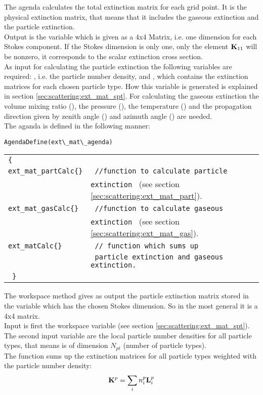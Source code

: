 The agenda  calculates the total extinction
matrix \ExtMat{}
for each grid point. It is the physical extinction matrix, that means
that it includes the gaseous extinction and the particle
extinction.\\
Output is the variable  which is given
as a 4x4 Matrix, i.e. one dimension for each Stokes component. If the
Stokes dimension is only one, only the element ${\bf K}_{11}$ will be
nonzero, it corresponds to the scalar extinction cross section. \\
As input for calculating the particle extinction the following
variables are required:
, i.e. the particle number density, and 
, which contains the extinction
matrices for each chosen particle type. How this variable is generated
is explained in section \ref{sec:scattering:ext_mat_spt}. For calculating the
gaseous extinction the volume mixing ratio (), the
pressure  (), the temperature  () and the
propagation direction given by zenith angle () and
azimuth angle () are needed.\\
The aganda is defined in the following manner:

\verb|AgendaDefine(ext\_mat\_agenda)|\\
\begin{tabular}[h]{l l}
\verb|{ |\\
\verb|ext_mat_partCalc{}| & \verb| //function to calculate particle |\\
& \verb|extinction | (see section \ref{sec:scattering:ext_mat_part}).\\
\verb|ext_mat_gasCalc{}| & \verb| //function to calculate gaseous | \\
& \verb|extinction | (see section \ref{sec:scattering:ext_mat_gas}).\\ 
\verb|ext_matCalc{}| &\verb| // function which sums up | \\
& \verb| particle extinction and gaseous extinction.|\\
\verb| }|
\end{tabular}

\label{sec:scattering:ext_mat_part}

The workspace method  gives as output the
particle extinction matrix  stored in the variable
 which has the chosen Stokes dimension. So in
the most general it is a 4x4 matrix.\\
Input is first the workspace variable  (see section
\ref{sec:scattering:ext_mat_spt}). The second input variable are the
local particle number densities  for all particle types,
that means  is of dimension $N_{pt}$ (number of
particle types). \\
The function sums up the extinction matrices for all particle types
weighted with the particle number density:
\begin{eqnarray}
  {\bf K}^{p} = \sum_i n^p_i {\bf L}^{p}_i 
\end{eqnarray}


